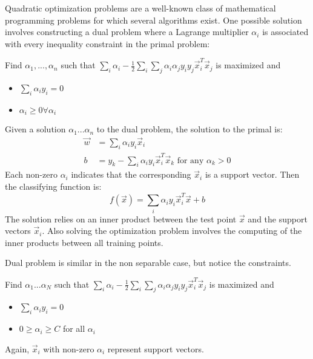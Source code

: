 Quadratic optimization problems are a well-known class of mathematical programming problems for which several algorithms exist. One possible solution involves constructing a dual problem where a Lagrange multiplier \(\alpha_i\) is associated with every inequality constraint in the primal problem:

Find \(\alpha_1, ..., \alpha_n\) such that \(\sum_i \alpha_i - \frac 1 2 \sum_i \sum_j \alpha_i \alpha_j y_i y_j \vec{x}_i^T \vec{x}_j\) is maximized and
\begin{itemize}
    \item
    \(\sum_i \alpha_i y_i = 0\)\\
    \item
    \(\alpha_i \geq 0 \forall \alpha_i\)
\end{itemize}

Given a solution \(\alpha_1...\alpha_n\) to the dual problem, the solution to the primal is:
\begin{align*}
    \vec{w} &= \sum_i \alpha_i y_i \vec{x}_i\\
    b &= y_k - \sum_i \alpha_i y_i \vec{x}_i^T \vec{x}_k \text{ for any } \alpha_k > 0
\end{align*}
Each non-zero \(\alpha_i\) indicates that the corresponding \(\vec{x}_i\) is a support vector. Then the classifying function is:
\begin{equation}
    f(\vec{x}) = \sum_i \alpha_i y_i \vec{x}_i^T \vec{x} + b
\end{equation}
The solution relies on an inner product between the test point \(\vec{x}\) and the support vectors \(\vec{x}_i\). Also solving the optimization problem involves the computing of the inner products between all training points.

Dual problem is similar in the non separable case, but notice the constraints.

Find \(\alpha_1...\alpha_N\) such that \(\sum_i \alpha_i - \frac 1 2 \sum_i \sum_j \alpha_i \alpha_j y_i y_j \vec{x}_i^T \vec{x}_j\) is maximized and
\begin{itemize}
    \item \(\sum_i \alpha_i y_i = 0\)\\
    \item \(0 \geq \alpha_i \geq C\) for all \(\alpha_i\)
\end{itemize}
Again, \(\vec{x}_i\) with non-zero \(\alpha_i\) represent support vectors.

